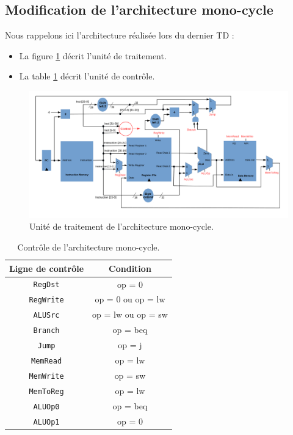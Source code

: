 \documentclass[12pt]{article}
\begin{document}
\subsection{Modification de l'architecture mono-cycle}

Nous rappelons ici l'architecture réalisée lors du dernier TD :
\begin{itemize}
\item La figure \ref{fig:mips_datapath} décrit l'unité de traitement.
\item La table \ref{table:mips_control} décrit l'unité de contrôle.\\
\end{itemize}

\begin{figure}[!htpb]
\begin{center}
  \includegraphics[width=19cm]{complete_single_cycle.pdf}
\end{center}
\caption{Unité de traitement de l'architecture mono-cycle.}
\label{fig:mips_datapath}
\end{figure}

\begin{table}[!htpb]
\begin{center}
\begin{tabular}{|c|c|}
\hline
Ligne de contrôle & Condition\\
\hline
\hline
\verb+RegDst+ & op = 0\\
\hline
\verb+RegWrite+ & op = 0 ou op = lw\\
\hline
\verb+ALUSrc+ & op = lw ou op = sw\\
\hline
\verb+Branch+ & op = beq\\
\hline
\verb+Jump+ & op = j\\
\hline
\verb+MemRead+ & op = lw\\
\hline
\verb+MemWrite+ & op = sw\\
\hline
\verb+MemToReg+ & op = lw\\
\hline
\verb+ALUOp0+ & op = beq\\
\hline
\verb+ALUOp1+ & op = 0\\
\hline
\end{tabular}
\end{center}
\caption{Contrôle de l'architecture mono-cycle.}
\label{table:mips_control}
\end{table}
\end{document}
